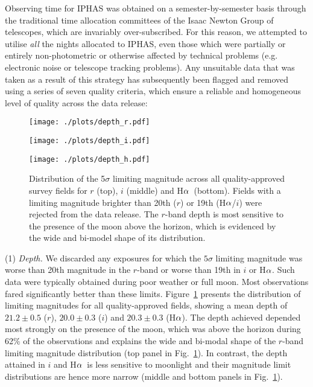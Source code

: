 \documentclass[useAMS,usenatbib]{mn2e}
\def\ha{\mbox{H$\rm \alpha$}}
\begin{document}
Observing time for IPHAS was obtained
on a semester-by-semester basis
through the traditional time allocation committees 
of the Isaac Newton Group of telescopes,
which are invariably over-subscribed.
For this reason, we attempted to utilise 
\emph{all} the nights allocated to IPHAS,
even those which were partially or entirely non-photometric
or otherwise affected by technical problems 
(e.g. electronic noise or telescope tracking problems).
Any unsuitable data that was taken as a result
of this strategy has subsequently been flagged and removed
using a series of seven quality criteria,
which ensure a reliable and homogeneous level of quality
across the data release:

\begin{figure}
    \begin{minipage}[b]{\linewidth}
        \texttt{[image: ./plots/depth\_r.pdf]} 
    \end{minipage}
    \begin{minipage}[b]{\linewidth}
        \texttt{[image: ./plots/depth\_i.pdf]} 
    \end{minipage}
    \begin{minipage}[b]{\linewidth}
        \texttt{[image: ./plots/depth\_h.pdf]} 
    \end{minipage}
    \caption{Distribution of the 5$\sigma$ limiting magnitude
             across all quality-approved survey fields
             for $r$ (top), $i$ (middle) and \ha\ (bottom).
             Fields with a limiting magnitude brighter than
             20th ($r$) or 19th (\ha/$i$) were rejected
             from the data release.
             The $r$-band depth is most sensitive 
             to the presence of the moon above the horizon, 
             which is evidenced by the wide and bi-model shape
             of its distribution.}
    \label{fig:depth}
\end{figure}

(1) \emph{Depth.} 
We discarded any exposures for which the $5\sigma$ limiting magnitude 
was worse than 20th magnitude in the $r$-band
or worse than 19th in $i$ or \ha. 
Such data were typically obtained during poor weather or full moon.
Most observations fared significantly better than these limits.
Figure~\ref{fig:depth} presents the distribution of limiting magnitudes
for all quality-approved fields,
showing a mean depth of 
$21.2\pm0.5$ ($r$), $20.0\pm0.3$ ($i$) and $20.3\pm0.3$ (\ha).
The depth achieved depended 
most strongly on the presence of the moon,
which was above the horizon during 62\% 
of the observations and explains the wide and bi-modal shape
of the $r$-band limiting magnitude distribution 
(top panel in Fig.~\ref{fig:depth}).
In contrast, the depth attained in $i$ and \ha\ 
is less sensitive to moonlight
and their magnitude limit distributions
are hence more narrow
(middle and bottom panels in Fig.~\ref{fig:depth}).
\end{document}
